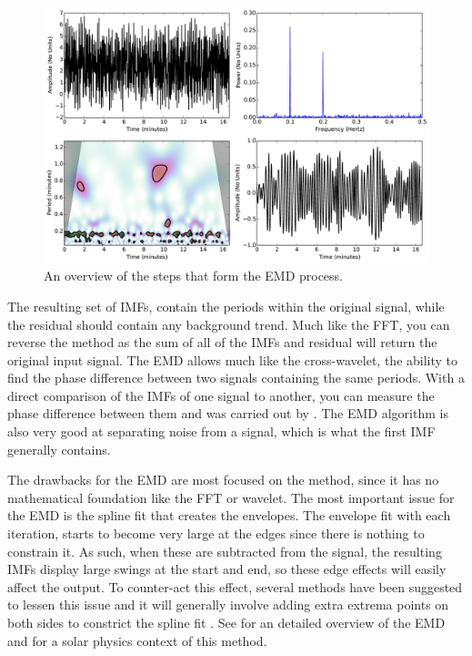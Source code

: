    	\begin{figure}
   		\centering
   		\includegraphics[width=1\textwidth]{signal_overview.pdf}
   		\caption{
   			     An overview of the steps that form the EMD process. 
   		        }
   		\label{fig:EMD}
   	\end{figure}
   	    
    The resulting set of IMFs, contain the periods within the original signal, while the residual should contain any background trend.
    Much like the FFT, you can reverse the method as the sum of all of the IMFs and residual will return the original input signal.
    The EMD allows much like the cross-wavelet, the ability to find the phase difference between two signals containing the same periods.
    With a direct comparison of the IMFs of one signal to another, you can measure the phase difference between them and was carried out by \cite{morton2011}.
    The EMD algorithm is also very good at separating noise from a signal, which is what the first IMF generally contains.
   
    The drawbacks for the EMD are most focused on the method, since it has no mathematical foundation like the FFT or wavelet.
    The most important issue for the EMD is the spline fit that creates the envelopes.
    The envelope fit with each iteration, starts to become very large at the edges since there is nothing to constrain it.
    As such, when these are subtracted from the signal, the resulting IMFs display large swings at the start and end, so these edge effects will easily affect the output.
    To counter-act this effect, several methods have been suggested to lessen this issue and it will generally involve adding extra extrema points on both sides to constrict the spline fit \citep{zeng2004simple}.
    See \cite{huang} for an detailed overview of the EMD and  \cite{terradas} for a solar physics context of this method.
    

